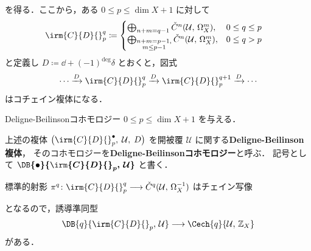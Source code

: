 \documentclass[TQFT_main]{subfiles}
\begin{document}
を得る．ここから，ある $0 \le p \le \dim X + 1$ に対して
\begin{align}
    \irm{C}{D}{}_{p}^q 
    &\coloneqq 
    \begin{cases}
        \bigoplus_{n+m = q-1} \check{C}^{n}(\mathcal{U},\, \Omega^{m}_X), &0 \le q \le p \\
        \bigoplus_{\substack{n+m = p-1,\\ m \le p-1}} \check{C}^{n}(\mathcal{U},\, \Omega^{m}_X), &0 \le q > p
    \end{cases}
\end{align}
と定義し $D \coloneqq \dd + (-1)^{\deg}\delta$ とおくと，図式
\begin{align}
    \cdots \xrightarrow{D} \irm{C}{D}{}_{p}^q  \xrightarrow{D} \irm{C}{D}{}_{p}^{q+1} \xrightarrow{D} \cdots
\end{align}
はコチェイン複体になる．

\begin{mydef}[label=def:Deligne-Beilinson]{Deligne-Beilinsonコホモロジー}
    $0 \le p \le \dim X + 1$ を与える．
    
    上述の複体 $\bigl( \irm{C}{D}{}_{p}^\bullet,\; \mathcal{U},\; D \bigr)$ を開被覆 $\mathcal{U}$ に関する\textbf{Deligne-Beilinson複体}，
    そのコホモロジーを\textbf{Deligne-Beilinsonコホモロジー}と呼ぶ．
    記号として $\bm{\DB{\bullet}{\irm{C}{D}{}_p,\, \mathcal{U}}}$ と書く．
\end{mydef}

標準的射影 $\pi^q \colon \irm{C}{D}{}_{p}^q \lto \check{C}^q(\mathcal{U},\, \Omega_X^{-1})$ はチェイン写像
\begin{center}
\end{center}
となるので，誘導準同型
\begin{align}
    \DB{q}{\irm{C}{D}{}_p,\, \mathcal{U}} \lto \Cech{q}{\mathcal{U},\, \mathbb{Z}_X}
\end{align}
がある．
\end{document}

